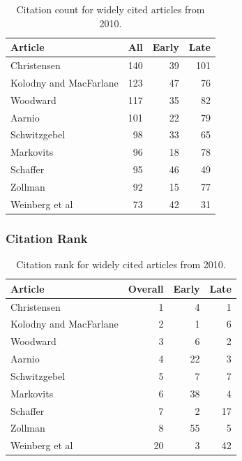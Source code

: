 \documentclass[
  10pt,
  letterpaper,
  DIV=11,
  numbers=noendperiod,
  twoside]{scrartcl}
\begin{document}
\begin{longtable}[]{@{}lrrr@{}}

\caption{\label{tbl-citation-count-2010}Citation count for widely cited
articles from 2010.}

\tabularnewline

\toprule\noalign{}
Article & All & Early & Late \\
\midrule\noalign{}
\endhead
\bottomrule\noalign{}
\endlastfoot
Christensen & 140 & 39 & 101 \\
Kolodny and MacFarlane & 123 & 47 & 76 \\
Woodward & 117 & 35 & 82 \\
Aarnio & 101 & 22 & 79 \\
Schwitzgebel & 98 & 33 & 65 \\
Markovits & 96 & 18 & 78 \\
Schaffer & 95 & 46 & 49 \\
Zollman & 92 & 15 & 77 \\
Weinberg et al & 73 & 42 & 31 \\

\end{longtable}

\subsubsection*{Citation Rank}\label{sec-rank-2010}

\begin{longtable}[]{@{}lrrr@{}}

\caption{\label{tbl-citation-rank-2010}Citation rank for widely cited
articles from 2010.}

\tabularnewline

\toprule\noalign{}
Article & Overall & Early & Late \\
\midrule\noalign{}
\endhead
\bottomrule\noalign{}
\endlastfoot
Christensen & 1 & 4 & 1 \\
Kolodny and MacFarlane & 2 & 1 & 6 \\
Woodward & 3 & 6 & 2 \\
Aarnio & 4 & 22 & 3 \\
Schwitzgebel & 5 & 7 & 7 \\
Markovits & 6 & 38 & 4 \\
Schaffer & 7 & 2 & 17 \\
Zollman & 8 & 55 & 5 \\
Weinberg et al & 20 & 3 & 42 \\

\end{longtable}
\end{document}
